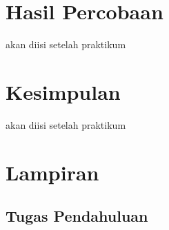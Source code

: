\section{Hasil Percobaan}
akan diisi setelah praktikum

\section{Kesimpulan}
akan diisi setelah praktikum

\section{Lampiran}

\subsection{Tugas Pendahuluan}
